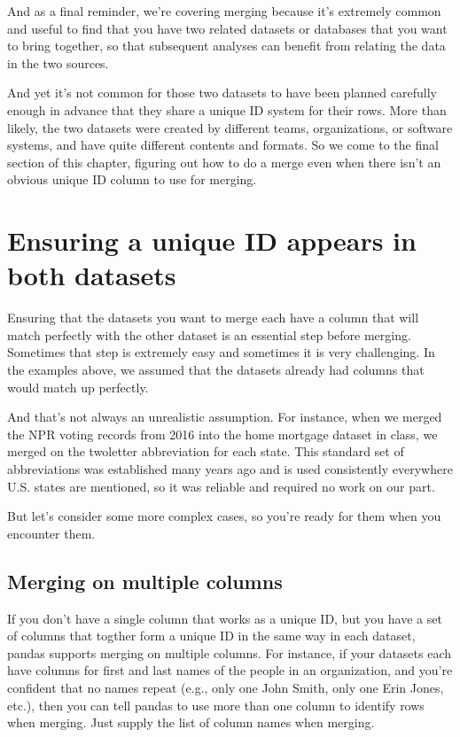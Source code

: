 \documentclass[letterpaper,10pt,english]{jupyterBook}
\begin{document}
\sphinxAtStartPar
And as a final reminder, we’re covering merging because it’s extremely common and useful to find that you have two related datasets or databases that you want to bring together, so that subsequent analyses can benefit from relating the data in the two sources.

\sphinxAtStartPar
And yet it’s not common for those two datasets to have been planned carefully enough in advance that they share a unique ID system for their rows.  More than likely, the two datasets were created by different teams, organizations, or software systems, and have quite different contents and formats.  So we come to the final section of this chapter, figuring out how to do a merge even when there isn’t an obvious unique ID column to use for merging.


\section{Ensuring a unique ID appears in both datasets}
\label{\detokenize{chapter-12-concat-and-merge:ensuring-a-unique-id-appears-in-both-datasets}}
\sphinxAtStartPar
Ensuring that the datasets you want to merge each have a column that will match perfectly with the other dataset is an essential step before merging.  Sometimes that step is extremely easy and sometimes it is very challenging.  In the examples above, we assumed that the datasets already had columns that would match up perfectly.

\sphinxAtStartPar
And that’s not always an unrealistic assumption.  For instance, when we merged the NPR voting records from 2016 into the home mortgage dataset in class, we merged on the two\sphinxhyphen{}letter abbreviation for each state.  This standard set of abbreviations was established many years ago and is used consistently everywhere U.S. states are mentioned, so it was reliable and required no work on our part.

\sphinxAtStartPar
But let’s consider some more complex cases, so you’re ready for them when you encounter them.


\subsection{Merging on multiple columns}
\label{\detokenize{chapter-12-concat-and-merge:merging-on-multiple-columns}}
\sphinxAtStartPar
If you don’t have a single column that works as a unique ID, but you have a set of columns that togther form a unique ID in the same way in each dataset, pandas supports merging on multiple columns.  For instance, if your datasets each have columns for first and last names of the people in an organization, and you’re confident that no names repeat (e.g., only one John Smith, only one Erin Jones, etc.), then you can tell pandas to use more than one column to identify rows when merging.  Just supply the list of column names when merging.
\end{document}
